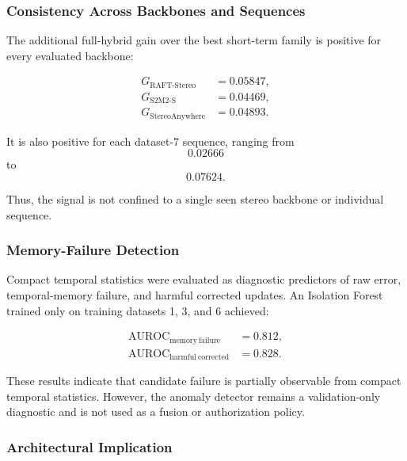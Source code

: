 \documentclass[11pt,a4paper]{article}
\begin{document}
\subsubsection{Consistency Across Backbones and Sequences}

The additional full-hybrid gain over the best short-term family is positive for every
evaluated backbone:

\begin{align}
    G_{\mathrm{RAFT\text{-}Stereo}}
    &= 0.05847,\\
    G_{\mathrm{S2M2\text{-}S}}
    &= 0.04469,\\
    G_{\mathrm{StereoAnywhere}}
    &= 0.04893.
\end{align}

It is also positive for each dataset-7 sequence, ranging from
\begin{equation}
    0.02666
\end{equation}
to
\begin{equation}
    0.07624.
\end{equation}

Thus, the signal is not confined to a single seen stereo backbone or individual sequence.

\subsubsection{Memory-Failure Detection}

Compact temporal statistics were evaluated as diagnostic predictors of raw error,
temporal-memory failure, and harmful corrected updates. An Isolation Forest trained only
on training datasets 1, 3, and 6 achieved:

\begin{align}
    \operatorname{AUROC}_{\mathrm{memory\ failure}}
    &= 0.812,\\
    \operatorname{AUROC}_{\mathrm{harmful\ corrected}}
    &= 0.828.
\end{align}

These results indicate that candidate failure is partially observable from compact temporal
statistics. However, the anomaly detector remains a validation-only diagnostic and is not
used as a fusion or authorization policy.

\subsubsection{Architectural Implication}
\end{document}
